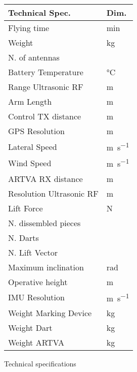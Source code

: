 \begin{margintable}
	\begin{center}
		\begin{tabular}{ p{3.7cm}  p{0.7cm} }
			\hline \textbf{Technical Spec.} & \textbf{Dim.}  \\ \hline
			Flying time & \si{\minute} \\
			Weight & \si{\kilogram} \\
			N. of antennas & ~ \\
			Battery Temperature & \si{\celsius} \\
			Range Ultrasonic RF & \si{\meter} \\
			Arm Length & \si{\meter} \\
			Control TX distance & \si{\meter} \\
			GPS Resolution & \si{\meter} \\
			Lateral Speed & \si{\meter\per\second} \\
			 Wind Speed & \si{\meter\per\second} \\
			 ARTVA RX distance & \si{\meter} \\
			 Resolution Ultrasonic RF & \si{\meter} \\
			 Lift Force & \si{\newton} \\
			 N. dissembled pieces & ~ \\
			 N. Darts & ~ \\
			 N. Lift Vector & ~ \\
			 Maximum inclination & \si{\radian} \\
			 Operative height & \si{\meter} \\
			 IMU Resolution & \si{\meter\per\second} \\
			 Weight Marking Device & \si{\kilogram} \\
			 Weight Dart & \si{\kilogram} \\
			 Weight ARTVA & \si{\kilogram} \\
			\hline
		\end{tabular}
	\end{center}
	\caption{Technical specifications \label{tbl:tech_specs}}
\end{margintable}

